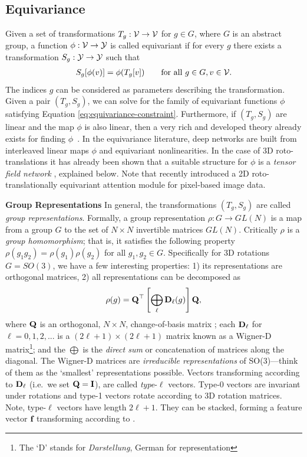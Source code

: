\documentclass{article}
\begin{document}
\subsection{Equivariance}
Given a set of transformations $T_g: \mathcal{V} \to \mathcal{V}$ for $g \in G$, where $G$ is an abstract group, a function $\phi : \mathcal{V} \to \mathcal{Y}$ is called equivariant if for every $g$ there exists a transformation $S_g: \mathcal{Y} \to \mathcal{Y}$ such that
\begin{align}
    S_g[\phi(v)] = \phi(T_g[v]) \qquad \text{for all } g\in G, v\in \mathcal{V} .\label{eq:equivariance-constraint}
\end{align}
The indices $g$ can be considered as parameters describing the transformation. Given a pair $(T_g, S_g)$, we can solve for the family of equivariant functions $\phi$ satisfying Equation \ref{eq:equivariance-constraint}. Furthermore, if $(T_g, S_g)$ are linear and the map $\phi$ is also linear, then a very rich and developed theory already exists for finding $\phi$~\citep{CohenW2016}. In the equivariance literature, deep networks are built from interleaved linear maps $\phi$ and equivariant nonlinearities. In the case of 3D roto-translations it has already been shown that a suitable structure for $\phi$ is a \emph{tensor field network} \citep{ThomasSKYKR18}, explained below. Note that \citet{Romero2020} recently introduced a 2D roto-translationally equivariant attention module for pixel-based image data. 

\textbf{Group Representations}
In general, the transformations $(T_g, S_g)$ are called \emph{group representations}. Formally, a group representation $\rho: G \to GL(N)$ is a map from a group $G$ to the set of $N\times N$ invertible matrices $GL(N)$. Critically $\rho$ is a \emph{group homomorphism}; that is, it satisfies the following property $\rho(g_1 g_2) = \rho(g_1)\rho(g_2)$ for all $g_1, g_2 \in G$. Specifically for 3D rotations $G=SO(3)$, we have a few interesting properties: 1) its representations are orthogonal matrices, 2) all representations can be decomposed as
\begin{align}
    \rho(g) = \textbf{Q}^{\top} \left [ \bigoplus_{\ell} \textbf{D}_{\ell}(g) \right ] \textbf{Q}, \label{eq:so3-representations}
\end{align}
where $\textbf{Q}$ is an orthogonal, $N \times N$, change-of-basis matrix \citep{chirikjian2001engineering}; each $\textbf{D}_\ell$ for $\ell = 0,1,2,...$ is a $(2\ell+1) \times (2\ell + 1)$ matrix known as a Wigner-D matrix\footnote{The `D' stands for \emph{Darstellung}, German for representation}; and the $\bigoplus$ is the \emph{direct sum} or concatenation of matrices along the diagonal. The Wigner-D matrices are \emph{irreducible representations} of SO(3)---think of them as the `smallest' representations possible. 
Vectors transforming according to $\textbf{D}_\ell$ (i.e.\ we set $\textbf{Q} = \textbf{I}$), are called \emph{type}-$\ell$ vectors. Type-0 vectors are invariant under rotations and type-1 vectors rotate according to 3D rotation matrices. Note, type-$\ell$ vectors have length $2\ell+1$. They can be stacked, forming a feature vector $\textbf{f}$ transforming according to . 
\end{document}
